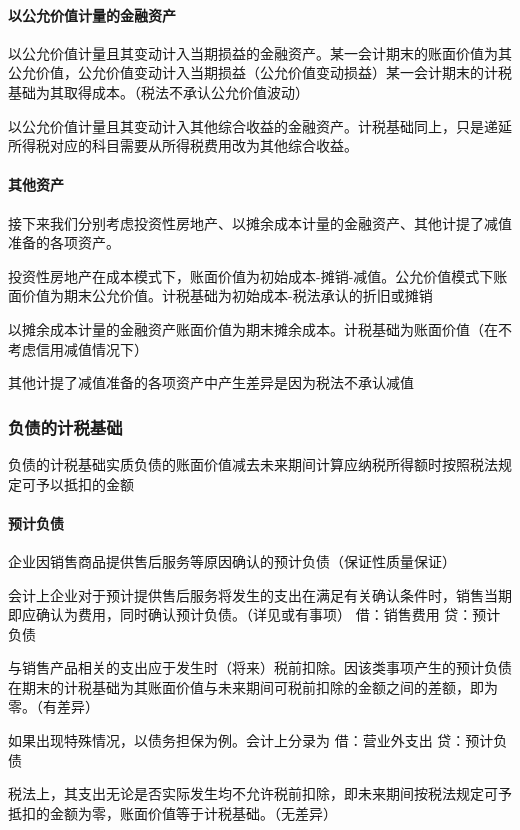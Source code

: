 \documentclass[UTF8,12pt]{ctexart}
\numberwithin{equation}{section} %
\numberwithin{figure}{section}
\numberwithin{table}{section}
\begin{document}
	\paragraph{以公允价值计量的金融资产}
	以公允价值计量且其变动计入当期损益的金融资产。某一会计期末的账面价值为其公允价值，公允价值变动计入当期损益（公允价值变动损益）某一会计期末的计税基础为其取得成本。（税法不承认公允价值波动）
	
	以公允价值计量且其变动计入其他综合收益的金融资产。计税基础同上，只是递延所得税对应的科目需要从所得税费用改为其他综合收益。
	
	\paragraph{其他资产}
	接下来我们分别考虑投资性房地产、以摊余成本计量的金融资产、其他计提了减值准备的各项资产。
	
	投资性房地产在成本模式下，账面价值为初始成本-摊销-减值。公允价值模式下账面价值为期末公允价值。计税基础为初始成本-税法承认的折旧或摊销
	
	以摊余成本计量的金融资产账面价值为期末摊余成本。计税基础为账面价值（在不考虑信用减值情况下）
	
	其他计提了减值准备的各项资产中产生差异是因为税法不承认减值
	
	\subsubsection{负债的计税基础}
	负债的计税基础实质负债的账面价值减去未来期间计算应纳税所得额时按照税法规定可予以抵扣的金额
	
	\paragraph{预计负债}
	企业因销售商品提供售后服务等原因确认的预计负债（保证性质量保证）
	
	会计上企业对于预计提供售后服务将发生的支出在满足有关确认条件时，销售当期即应确认为费用，同时确认预计负债。（详见或有事项）
	借：销售费用 贷：预计负债
	
	与销售产品相关的支出应于发生时（将来）税前扣除。因该类事项产生的预计负债在期末的计税基础为其账面价值与未来期间可税前扣除的金额之间的差额，即为零。（有差异）
	
	如果出现特殊情况，以债务担保为例。会计上分录为
	借：营业外支出
	贷：预计负债
	
	税法上，其支出无论是否实际发生均不允许税前扣除，即未来期间按税法规定可予抵扣的金额为零，账面价值等于计税基础。（无差异）
	
\end{document}
